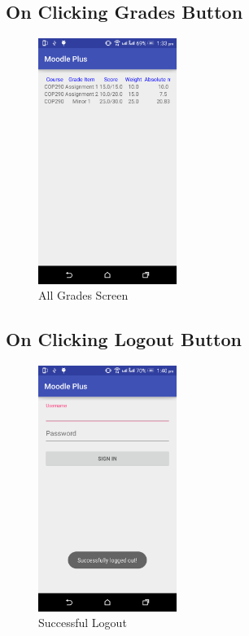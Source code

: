 \documentclass[12pt]{article}
\begin{document}
\subsection{On Clicking Grades Button}
\begin{figure}[!ht]
	\centering
	\includegraphics[width=0.4\textwidth]{images/allgrades.png}
	\caption{All Grades Screen}
\end{figure}
\FloatBarrier
\subsection{On Clicking Logout Button}
\begin{figure}[!ht]
	\centering
	\includegraphics[width=0.4\textwidth]{images/logout.png}
	\caption{Successful Logout }
\end{figure}
\FloatBarrier
\end{document}
